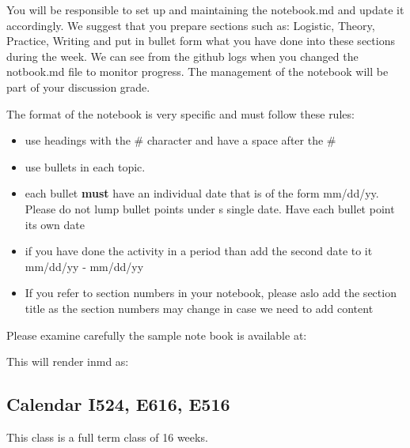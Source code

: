 You will be responsible to set up and maintaining the notebook.md and
update it accordingly. We suggest that you prepare sections such as:
Logistic, Theory, Practice, Writing and put in bullet form what you have
done into these sections during the week. We can see from the github
logs when you changed the notbook.md file to monitor progress. The
management of the notebook will be part of your discussion grade.

The format of the notebook is very specific and must follow these rules:

\begin{itemize}
\item use headings with the \# character and have a space after the \#
\item use bullets in each topic.
\item each bullet \textbf{must} have an individual date that is of the
  form mm/dd/yy. Please do not lump bullet points under s single
  date. Have each bullet point its own date
\item if you have done the activity in a period than add the second
  date to it mm/dd/yy - mm/dd/yy
\item If you refer to section numbers in your notebook, please aslo
  add the section title as the section numbers may change in case we
  need to add content
\end{itemize}

Please examine carefully the sample note book is available at:


This will render inmd as:


\subsection{Calendar I524, E616, E516}\label{calendar}

This class is a full term class of 16 weeks.

